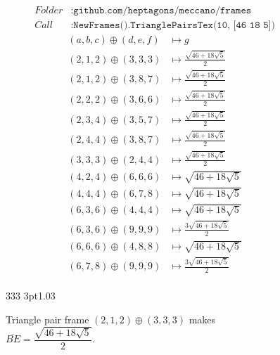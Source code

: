 \documentclass[11pt]{article}
\begin{document}
\newenvironment{MyColorPar}[1]{
    \leavevmode\color{#1}\ignorespaces
}{
}

\begin{MyColorPar}{blue}
\begin{align*}
Folder &: \texttt{github.com/heptagons/meccano/frames}\\
Call &: \texttt{NewFrames().TrianglePairsTex(10, [46 18 5])}\end{align*}
\begin{align*}
(a,b,c) \oplus (d,e,f) &\mapsto g\\
\hline
(2,1,2) \oplus (3,3,3) &\mapsto \frac{\sqrt{46+18\sqrt{5}}}{2} \\
(2,1,2) \oplus (3,8,7) &\mapsto \frac{\sqrt{46+18\sqrt{5}}}{2} \\
(2,2,2) \oplus (3,6,6) &\mapsto \frac{\sqrt{46+18\sqrt{5}}}{2} \\
(2,3,4) \oplus (3,5,7) &\mapsto \frac{\sqrt{46+18\sqrt{5}}}{2} \\
(2,4,4) \oplus (3,8,7) &\mapsto \frac{\sqrt{46+18\sqrt{5}}}{2} \\
(3,3,3) \oplus (2,4,4) &\mapsto \frac{\sqrt{46+18\sqrt{5}}}{2} \\
(4,2,4) \oplus (6,6,6) &\mapsto \sqrt{46+18\sqrt{5}} \\
(4,4,4) \oplus (6,7,8) &\mapsto \sqrt{46+18\sqrt{5}} \\
(6,3,6) \oplus (4,4,4) &\mapsto \sqrt{46+18\sqrt{5}} \\
(6,3,6) \oplus (9,9,9) &\mapsto \frac{3\sqrt{46+18\sqrt{5}}}{2} \\
(6,6,6) \oplus (4,8,8) &\mapsto \sqrt{46+18\sqrt{5}} \\
(6,7,8) \oplus (9,9,9) &\mapsto \frac{3\sqrt{46+18\sqrt{5}}}{2} \\
\end{align*}
\end{MyColorPar}

\begin{figure}[H]
\centering
\begin{center}
 {3}{3}{3} {3pt}{1.0}{3} %
\end{center}
\caption{Triangle pair frame $(2,1,2) \oplus (3,3,3)$ makes $\overline{BE} = \dfrac{\sqrt{46+18\sqrt{5}}}{2}$.}
\label{fig:tripair212333}
\end{figure}
\end{document}
